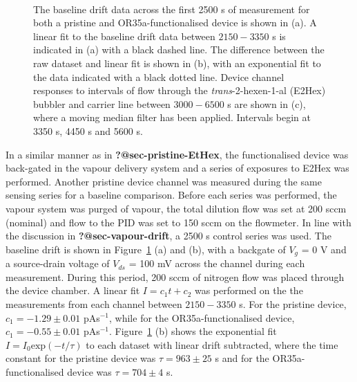 \documentclass[
  a4paper,
]{scrbook}
\begin{document}
\begin{figure}
\begin{minipage}[t]{0.80\linewidth}
{{}

}

\end{minipage}%
%
\begin{minipage}[t]{0.05\linewidth}

{\centering 

~

}

\end{minipage}%

\caption{\label{fig-E2Hex-sampling}The baseline drift data across the
first 2500 s of measurement for both a pristine and OR35a-functionalised
device is shown in (a). A linear fit to the baseline drift data between
\(2150-3350\) s is indicated in (a) with a black dashed line. The
difference between the raw dataset and linear fit is shown in (b), with
an exponential fit to the data indicated with a black dotted line.
Device channel responses to intervals of flow through the
\emph{trans}-2-hexen-1-al (E2Hex) bubbler and carrier line between
\(3000-6500\) s are shown in (c), where a moving median filter has been
applied. Intervals begin at 3350 s, 4450 s and 5600 s.}

\end{figure}

In a similar manner as in \textbf{?@sec-pristine-EtHex}, the
functionalised device was back-gated in the vapour delivery system and a
series of exposures to E2Hex was performed. Another pristine device
channel was measured during the same sensing series for a baseline
comparison. Before each series was performed, the vapour system was
purged of vapour, the total dilution flow was set at 200 sccm (nominal)
and flow to the PID was set to 150 sccm on the flowmeter. In line with
the discussion in \textbf{?@sec-vapour-drift}, a 2500 s control series
was used. The baseline drift is shown in Figure~\ref{fig-E2Hex-sampling}
(a) and (b), with a backgate of \(V_g\) = 0 V and a source-drain voltage
of \(V_{ds}\) = 100 mV across the channel during each measurement.
During this period, 200 sccm of nitrogen flow was placed through the
device chamber. A linear fit \(I = c_1t + c_2\) was performed on the the
measurements from each channel between \(2150-3350\) s. For the pristine
device, \(c_1 = -1.29\pm0.01\) pAs\(^{-1}\), while for the
OR35a-functionalised device, \(c_1 = -0.55\pm0.01\) pAs\(^{-1}\).
Figure~\ref{fig-E2Hex-sampling} (b) shows the exponential fit
\(I = I_0\textrm{exp}(-t/\tau)\) to each dataset with linear drift
subtracted, where the time constant for the pristine device was
\(\tau = 963 \pm 25\) s and for the OR35a-functionalised device was
\(\tau = 704 \pm 4\) s.
\end{document}
